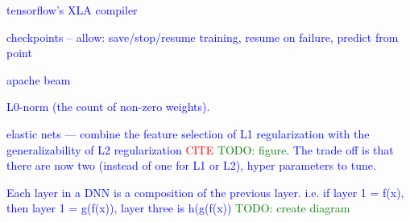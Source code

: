 

\textcolor{blue}{tensorflow's XLA compiler}

\textcolor{blue}{checkpoints -- allow: save/stop/resume training, resume on failure, predict from point}

\textcolor{blue}{apache beam}







\textcolor{blue}{L0-norm (the count of non-zero weights).}


\textcolor{blue}{elastic nets --- combine the feature selection of L1 regularization with the generalizability of L2 regularization \textcolor{red}{CITE} \textcolor{green}{TODO: figure}. The trade off is that there are now two (instead of one for L1 or L2), hyper parameters to tune.}


\textcolor{blue}{Each layer in a DNN is a composition of the previous layer. i.e. if layer 1 = f(x), then layer 1 = g(f(x)), layer three is h(g(f(x)) \textcolor{green}{TODO: create diagram}}